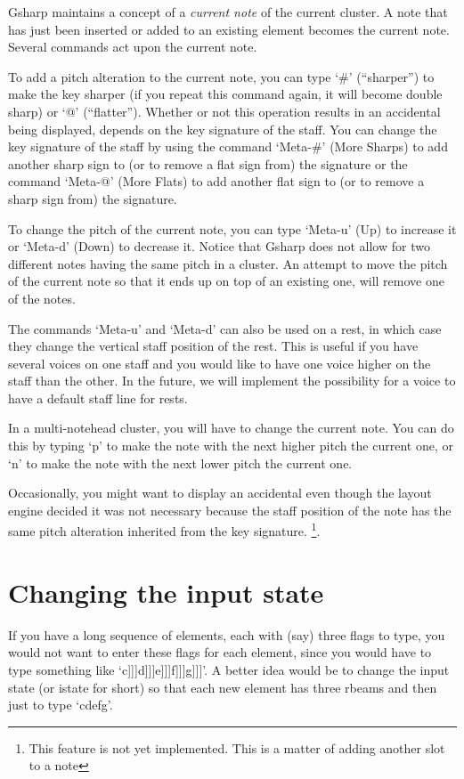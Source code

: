 \documentclass[11pt]{book}
\def\gs{Gsharp}
\def\unimp#1{\footnote{This feature is not yet implemented.  #1}}
\def\kbd#1{`#1'}
\def\command#1{``#1''}
\begin{document}
{\gs} maintains a concept of a \emph{current note} of the current cluster.  A note that has
just been inserted or added to an existing element becomes the
current note.  Several commands act upon the current note. 

To add a pitch alteration to the current note, you can type \kbd{\#}
(\command{sharper}) to make the key sharper (if you repeat this
command again, it will become double sharp) or \kbd{@}
(\command{flatter}).  Whether or not this operation results in an
accidental being displayed, depends on the key signature of the staff.
You can change the key signature of the staff by using the command
\kbd{Meta-\#} (More Sharps) to add another sharp sign to (or to remove
a flat sign from) the signature or the command \kbd{Meta-@} (More
Flats) to add another flat sign to (or to remove a sharp sign from)
the signature. 

To change the pitch of the current note, you can type \kbd{Meta-u}
(Up) to increase it or \kbd{Meta-d} (Down) to decrease it.  Notice
that {\gs} does not allow for two different notes having the same
pitch in a cluster.  An attempt to move the pitch of the current note
so that it ends up on top of an existing one, will remove one of the
notes.

The commands \kbd{Meta-u} and \kbd{Meta-d} can also be used on a rest,
in which case they change the vertical staff position of the rest.
This is useful if you have several voices on one staff and you would
like to have one voice higher on the staff than the other.  In the
future, we will implement the possibility for a voice to have a
default staff line for rests. 

In a multi-notehead cluster, you will have to change the current
note.  You can do this by typing \kbd{p} to make the note with the next
higher pitch the current one, or \kbd{n} to make the note with the
next lower pitch the current one.  

Occasionally, you might want to display an accidental even though the
layout engine decided it was not necessary because the staff position
of the note has the same pitch alteration inherited from the key
signature.  \unimp{This is a matter of adding another slot to a
note}. 

\chapter{Changing the input state}

If you have a long sequence of elements, each with (say) three flags
to type, you would not want to enter these flags for each element,
since you would have to type something like
\kbd{c]]]d]]]e]]]f]]]g]]]}.  A better idea would be to change the
input state (or istate for short) so that each new element has three
rbeams and then just to type \kbd{cdefg}.
\end{document}
